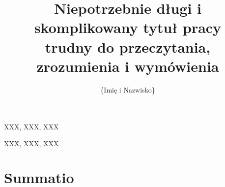 \documentclass[
    left=2.5cm,         %
    right=2.5cm,        %
    top=2.5cm,          %
    bottom=3cm,         %
    bindingoffset=6mm,  %
    nohyphenation=false %
]{eiti/eiti-thesis}
\begin{document}
\MasterThesis %
{}
\title{
    Niepotrzebnie długi i skomplikowany tytuł pracy \\
    trudny do przeczytania, zrozumienia i wymówienia
}
\author{\{Imię i Nazwisko\}}
\date{\the\year}
\maketitle

\cleardoublepage %
\streszczenie \lipsum[1-3]
\slowakluczowe XXX, XXX, XXX

\newpage
\abstract \kant[1-3]
\keywords XXX, XXX, XXX

\cleardoublepage  %
\pagestyle{plain}
\makeauthorship

\cleardoublepage %
\tableofcontents

\cleardoublepage %
\pagestyle{headings}


\newpage %
\section{Summatio}          %
\lipsum[5-10]
\end{document}
